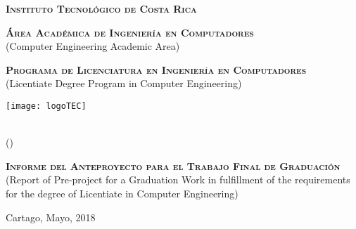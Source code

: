 
\thispagestyle{empty} 

\begin{center}

\textsc{\large \textbf{Instituto Tecnol\'ogico de Costa Rica}} \\
\par\vspace{7mm}


\textsc{\large \textbf{\'Area Acad\'emica de Ingenier\'ia en Computadores}}\\
(Computer Engineering Academic Area)\\
\par\vspace{7mm}

\textsc{\large \textbf{Programa de Licenciatura en Ingenier\'ia en Computadores}}\\
(Licentiate Degree Program in Computer Engineering)



\par\vspace{20mm}

\texttt{[image: logoTEC]}

\par\vspace*{\fill}

{\LARGE\bf{\textsf{ \Large \scriptTitle}}}\\
(\scriptEnglishTitle)

\par\vspace*{\fill}

\textsc{\large \textbf{Informe del Anteproyecto para el Trabajo Final de Graduaci\'on}}\\
(Report of Pre-project for a Graduation Work in fulfillment of the requirements for the degree of 
Licentiate in Computer Engineering)

\par\vspace*{\fill}


\textsc{\large\bf \scriptAuthor}

\vspace*{\fill}

{Cartago, Mayo, 2018}

\end{center}
\newpage 
\cleardoublepage  
